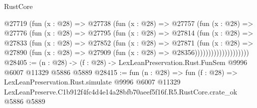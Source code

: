 \begin{lexlean}{RustCore}
\begin{coremodule}
                    @27719
                      (fun (x : @28) =>
                      @27738
                        (fun (x : @28) =>
                        @27757
                          (fun (x : @28) =>
                          @27776
                            (fun (x : @28) =>
                            @27795
                              (fun (x : @28) =>
                              @27814
                                (fun (x : @28) =>
                                @27833
                                  (fun (x : @28) =>
                                  @27852
                                    (fun (x : @28) =>
                                    @27871
                                      (fun (x : @28) =>
                                      @27890
                                        (fun (x : @28) =>
                                        @27909 (fun (x : @28) => @28356))))))))))))))))))))
@28405 := (n : @28) -> (f : @28) -> LexLeanPreservation.Rust.FunSem @9996 @6007 @11329 @5886 @5889
@28415 := fun (n : @28) =>
  fun (f : @28) =>
  LexLeanPreservation.Rust.simulate
    @9996
    @6007
    @11329
    LexLeanPreserve.C1b912f4fc4d4e14a28bfb70aeef5f16f.R5.RustCore.crate_ok
    @5886
    @5889
\end{coremodule}
\end{lexlean}
